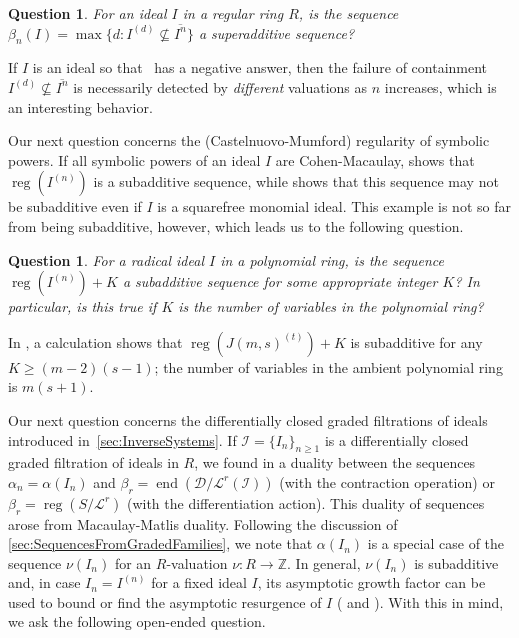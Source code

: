 \documentclass[12pt, reqno]{amsart}
\numberwithin{equation}{section}
\def\a{\ensuremath{\alpha}}
\def\b{\ensuremath{\beta}}
\newcommand{\Z}{{\mathbb Z}}
\newcommand{\cL}{{\mathcal L}}
\newcommand{\I}{{\mathcal I}}
\DeclareMathOperator{\reg}{reg}
\DeclareMathOperator{\soc}{end}
\theoremstyle{plain} %
\newtheorem{question}[thm]{Question}
\theoremstyle{definition}
\theoremstyle{remark}
\begin{document}
\begin{question}\label{ques:superadditiveintegralclosure}
For an ideal $I$ in a regular ring $R$, is the sequence $\beta_n(I) =\max\{d:I^{(d)}\not\subseteq \overline{I^n}\}$ a superadditive sequence?
\end{question}

If $I$ is an ideal so that~ has a negative answer, then the failure of containment $I^{(d)}\not\subseteq \overline{I^n}$ is necessarily detected by \textit{different} valuations as $n$ increases, which is an interesting behavior.

Our next question concerns the (Castelnuovo-Mumford) regularity of symbolic powers.  If all symbolic powers of an ideal $I$ are Cohen-Macaulay,  shows that $\reg(I^{(n)})$ is a subadditive sequence, while  shows that this sequence may not be subadditive even if $I$ is a squarefree monomial ideal.  This example is not so far from being subadditive, however, which leads us to the following question.

\begin{question}
For a radical ideal $I$ in a polynomial ring, is the sequence $\reg(I^{(n)})+K$ a subadditive sequence for some appropriate integer $K$?  In particular, is this true if $K$ is the number of variables in the polynomial ring?
\end{question}

In , a calculation shows that $\reg(J(m,s)^{(t)})+K$ is subadditive for any $K\ge (m-2)(s-1)$; the number of variables in the ambient polynomial ring is $m(s+1)$.

Our next question concerns the differentially closed graded filtrations of ideals introduced in~\cref{sec:InverseSystems}.  If $\I=\{I_n\}_{n\ge 1}$ is a differentially closed graded filtration of ideals in $R$, we found in  a duality between the sequences $\a_n=\alpha(I_n)$ and $\b_r=\soc(\mathcal{D}/\cL^r(\I))$ (with the contraction operation) or $\b_r=\reg(S/\cL^r)$ (with the differentiation action).  This duality of sequences arose from Macaulay-Matlis duality.  Following the discussion of \cref{sec:SequencesFromGradedFamilies}, we note that $\alpha(I_n)$ is a special case of the sequence $\nu(I_n)$ for an $R$-valuation $\nu:R\to \Z$.  In general, $\nu(I_n)$ is subadditive and, in case $I_n=I^{(n)}$ for a fixed ideal $I$, its asymptotic growth factor can be used to bound or find the asymptotic resurgence of $I$ ( and ).  With this in mind, we ask the following open-ended question.
\end{document}
